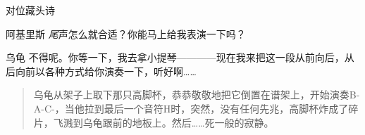 \begin{dialog}{对位藏头诗}
\begin{dialogue}
\item[阿基里斯]\emph{尾}声怎么就合适？你能马上给我表演一下吗？

\item[乌龟]\CJKglue 不得呢。你等一下，我去拿小提琴————现在我来把这一段从前向后，从后向前以各种方式给你演奏一下，听好啊……

\bigskip

\begin{quote}
乌龟从架子上取下那只高脚杯，恭恭敬敬地把它倒置在谱架上，开始演奏B-A-C-，当他拉到最后一个音符H时，突然，没有任何先兆，高脚杯炸成了碎片，飞溅到乌龟跟前的地板上。然后……死一般的寂静。
\end{quote}

\end{dialogue}

\end{dialog}
